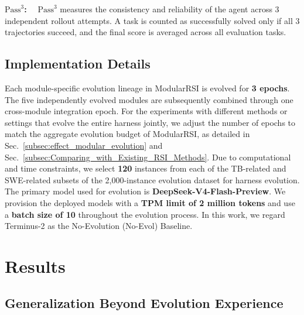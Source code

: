 \documentclass{article} %
\begin{document}
\noindent\textbf{$\text{Pass}^3$:}~~
$\text{Pass}^3$ measures the consistency and reliability of the agent across $3$ independent rollout attempts. A task is counted as successfully solved only if all $3$ trajectories succeed, and the final score is averaged across all evaluation tasks.

\subsection{Implementation Details}
\label{subsec:imp_details}

Each module-specific evolution lineage in ModularRSI is evolved for \textbf{3 epochs}. The five independently evolved modules are subsequently combined through one cross-module integration epoch. 
For the experiments with different methods or settings that evolve the entire harness jointly, we adjust the number of epochs to match the aggregate evolution budget of ModularRSI, as detailed in Sec.~\ref{subsec:effect_modular_evolution} and Sec.~\ref{subsec:Comparing_with_Existing_RSI_Methods}.
Due to computational and time constraints, we select \textbf{120} instances from each of the TB-related and SWE-related subsets of the 2,000-instance evolution dataset for harness evolution. The primary model used for evolution is \textbf{DeepSeek-V4-Flash-Preview}. We provision the deployed models with a \textbf{TPM limit of 2 million tokens} and use a \textbf{batch size of 10} throughout the evolution process.
In this work, we regard Terminus-2 as the No-Evolution (No-Evol) Baseline.











\section{Results}

\subsection{Generalization Beyond Evolution Experience}
\end{document}
